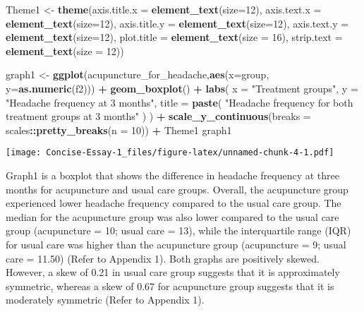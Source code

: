 \documentclass[
]{article}
\newenvironment{Shaded}{\begin{snugshade}}{\end{snugshade}}
\newcommand{\DataTypeTok}[1]{\textcolor[rgb]{0.13,0.29,0.53}{#1}}
\newcommand{\DecValTok}[1]{\textcolor[rgb]{0.00,0.00,0.81}{#1}}
\newcommand{\KeywordTok}[1]{\textcolor[rgb]{0.13,0.29,0.53}{\textbf{#1}}}
\newcommand{\NormalTok}[1]{#1}
\newcommand{\OperatorTok}[1]{\textcolor[rgb]{0.81,0.36,0.00}{\textbf{#1}}}
\newcommand{\StringTok}[1]{\textcolor[rgb]{0.31,0.60,0.02}{#1}}
\begin{document}
\begin{Shaded}
\begin{Highlighting}[]
\NormalTok{Theme1 <-}\StringTok{ }\KeywordTok{theme}\NormalTok{(}\DataTypeTok{axis.title.x =} \KeywordTok{element_text}\NormalTok{(}\DataTypeTok{size=}\DecValTok{12}\NormalTok{), }
                \DataTypeTok{axis.text.x  =} \KeywordTok{element_text}\NormalTok{(}\DataTypeTok{size=}\DecValTok{12}\NormalTok{), }
                \DataTypeTok{axis.title.y =} \KeywordTok{element_text}\NormalTok{(}\DataTypeTok{size=}\DecValTok{12}\NormalTok{), }
                \DataTypeTok{axis.text.y  =} \KeywordTok{element_text}\NormalTok{(}\DataTypeTok{size=}\DecValTok{12}\NormalTok{), }
                \DataTypeTok{plot.title =} \KeywordTok{element_text}\NormalTok{(}\DataTypeTok{size =} \DecValTok{16}\NormalTok{),}
                \DataTypeTok{strip.text =} \KeywordTok{element_text}\NormalTok{(}\DataTypeTok{size =} \DecValTok{12}\NormalTok{)) }

\NormalTok{graph1 <-}\StringTok{ }\KeywordTok{ggplot}\NormalTok{(acupuncture_for_headache,}\KeywordTok{aes}\NormalTok{(}\DataTypeTok{x=}\NormalTok{group,  }\DataTypeTok{y=}\KeywordTok{as.numeric}\NormalTok{(f2))) }\OperatorTok{+}
\StringTok{  }\KeywordTok{geom_boxplot}\NormalTok{() }\OperatorTok{+}
\StringTok{  }\KeywordTok{labs}\NormalTok{(}
    \DataTypeTok{x =} \StringTok{"Treatment groups"}\NormalTok{,}
    \DataTypeTok{y =} \StringTok{"Headache frequency at 3 months"}\NormalTok{,}
    \DataTypeTok{title =} \KeywordTok{paste}\NormalTok{(}
      \StringTok{"Headache frequency for both treatment groups at 3 months"}
\NormalTok{    )}
\NormalTok{  ) }\OperatorTok{+}
\StringTok{  }\KeywordTok{scale_y_continuous}\NormalTok{(}\DataTypeTok{breaks =}\NormalTok{ scales}\OperatorTok{::}\KeywordTok{pretty_breaks}\NormalTok{(}\DataTypeTok{n =} \DecValTok{10}\NormalTok{)) }\OperatorTok{+}
\StringTok{  }\NormalTok{Theme1}
\NormalTok{graph1}
\end{Highlighting}
\end{Shaded}

\texttt{[image: Concise-Essay-1\_files/figure-latex/unnamed-chunk-4-1.pdf]}

Graph1 is a boxplot that shows the difference in headache frequency at
three months for acupuncture and usual care groups. Overall, the
acupuncture group experienced lower headache frequency compared to the
usual care group. The median for the acupuncture group was also lower
compared to the usual care group (acupuncture = 10; usual care = 13),
while the interquartile range (IQR) for usual care was higher than the
acupuncture group (acupuncture = 9; usual care = 11.50) (Refer to
Appendix 1). Both graphs are positively skewed. However, a skew of 0.21
in usual care group suggests that it is approximately symmetric, whereas
a skew of 0.67 for acupuncture group suggests that it is moderately
symmetric (Refer to Appendix 1).
\end{document}
